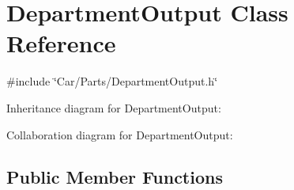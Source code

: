\hypertarget{classDepartmentOutput}{}\section{Department\+Output Class Reference}
\label{classDepartmentOutput}


{\ttfamily \#include \char`\"{}Car/\+Parts/\+Department\+Output.\+h\char`\"{}}



Inheritance diagram for Department\+Output\+:


Collaboration diagram for Department\+Output\+:
\subsection*{Public Member Functions}

